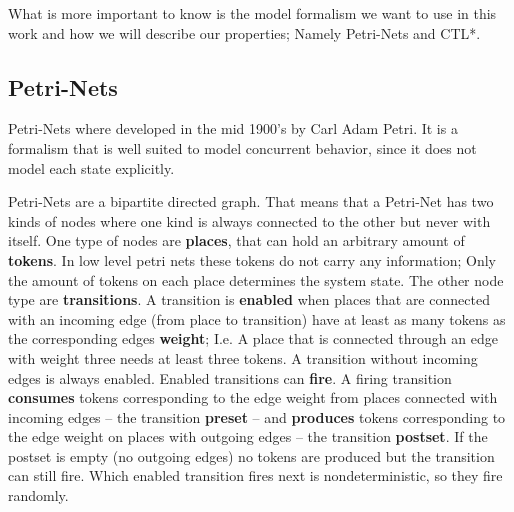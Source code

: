 What is more important to know is the model formalism we want to use in this work and how we will describe our properties; Namely Petri-Nets and CTL*.


\subsection{Petri-Nets}
\label{rel_petri}
Petri-Nets where developed in the mid 1900's by Carl Adam Petri\cite{petri1962kommunikation}.
It is a formalism that is well suited to model concurrent behavior, since it does not model each state explicitly.

Petri-Nets are a bipartite directed graph.
That means that a Petri-Net has two kinds of nodes where one kind is always connected to the other but never with itself.
One type of nodes are \textbf{places}, that can hold an arbitrary amount of \textbf{tokens}.
In low level petri nets these tokens do not carry any information; 
Only the amount of tokens on each place determines the system state.
The other node type are \textbf{transitions}.
A transition is \textbf{enabled} when places that are connected with an incoming edge (from place to transition) have at least as many tokens as the corresponding edges \textbf{weight};
I.e. A place that is connected through an edge with weight three needs at least three tokens.
A transition without incoming edges is always enabled.
Enabled transitions can \textbf{fire}.
A firing transition \textbf{consumes} tokens corresponding to the edge weight from places connected with incoming edges -- the transition \textbf{preset} -- and \textbf{produces} tokens corresponding to the edge weight on places with outgoing edges -- the transition \textbf{postset}.
If the postset is empty (no outgoing edges) no tokens are produced but the transition can still fire.
Which enabled transition fires next is nondeterministic, so they fire randomly.

